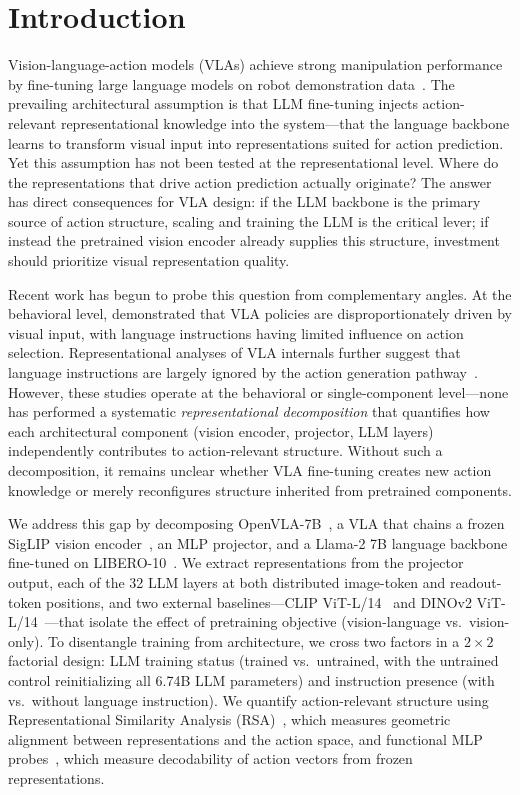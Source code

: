 \section{Introduction}
\label{sec:introduction}

Vision-language-action models (VLAs) achieve strong manipulation performance by fine-tuning large language models on robot demonstration data~\cite{brohan2023_rt2,kim2024_openvla}.
The prevailing architectural assumption is that LLM fine-tuning injects action-relevant representational knowledge into the system---that the language backbone learns to transform visual input into representations suited for action prediction.
Yet this assumption has not been tested at the representational level.
Where do the representations that drive action prediction actually originate?
The answer has direct consequences for VLA design: if the LLM backbone is the primary source of action structure, scaling and training the LLM is the critical lever; if instead the pretrained vision encoder already supplies this structure, investment should prioritize visual representation quality.

Recent work has begun to probe this question from complementary angles.
At the behavioral level, \cite{grant2026} demonstrated that VLA policies are disproportionately driven by visual input, with language instructions having limited influence on action selection.
Representational analyses of VLA internals further suggest that language instructions are largely ignored by the action generation pathway~\cite{haon2025}.
However, these studies operate at the behavioral or single-component level---none has performed a systematic \emph{representational decomposition} that quantifies how each architectural component (vision encoder, projector, LLM layers) independently contributes to action-relevant structure.
Without such a decomposition, it remains unclear whether VLA fine-tuning creates new action knowledge or merely reconfigures structure inherited from pretrained components.

We address this gap by decomposing OpenVLA-7B~\cite{kim2024_openvla,karamcheti2024}, a VLA that chains a frozen SigLIP vision encoder~\cite{zhai2023_siglip}, an MLP projector, and a Llama-2 7B language backbone fine-tuned on LIBERO-10~\cite{liu2023_libero}.
We extract representations from the projector output, each of the 32 LLM layers at both distributed image-token and readout-token positions, and two external baselines---CLIP ViT-L/14~\cite{radford2021_clip} and DINOv2 ViT-L/14~\cite{oquab2024_dinov2}---that isolate the effect of pretraining objective (vision-language vs.\ vision-only).
To disentangle training from architecture, we cross two factors in a $2 \times 2$ factorial design: LLM training status (trained vs.\ untrained, with the untrained control reinitializing all 6.74B LLM parameters) and instruction presence (with vs.\ without language instruction).
We quantify action-relevant structure using Representational Similarity Analysis (RSA)~\cite{kriegeskorte2008}, which measures geometric alignment between representations and the action space, and functional MLP probes~\cite{alain2017}, which measure decodability of action vectors from frozen representations.

